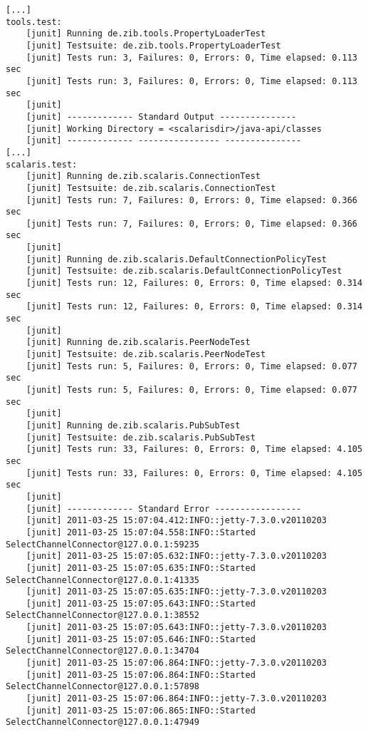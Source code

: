 \begin{lstlisting}[language={}]
%> make java-test
[...]
tools.test:
    [junit] Running de.zib.tools.PropertyLoaderTest
    [junit] Testsuite: de.zib.tools.PropertyLoaderTest
    [junit] Tests run: 3, Failures: 0, Errors: 0, Time elapsed: 0.113 sec
    [junit] Tests run: 3, Failures: 0, Errors: 0, Time elapsed: 0.113 sec
    [junit] 
    [junit] ------------- Standard Output ---------------
    [junit] Working Directory = <scalarisdir>/java-api/classes
    [junit] ------------- ---------------- ---------------
[...]
scalaris.test:
    [junit] Running de.zib.scalaris.ConnectionTest
    [junit] Testsuite: de.zib.scalaris.ConnectionTest
    [junit] Tests run: 7, Failures: 0, Errors: 0, Time elapsed: 0.366 sec
    [junit] Tests run: 7, Failures: 0, Errors: 0, Time elapsed: 0.366 sec
    [junit] 
    [junit] Running de.zib.scalaris.DefaultConnectionPolicyTest
    [junit] Testsuite: de.zib.scalaris.DefaultConnectionPolicyTest
    [junit] Tests run: 12, Failures: 0, Errors: 0, Time elapsed: 0.314 sec
    [junit] Tests run: 12, Failures: 0, Errors: 0, Time elapsed: 0.314 sec
    [junit] 
    [junit] Running de.zib.scalaris.PeerNodeTest
    [junit] Testsuite: de.zib.scalaris.PeerNodeTest
    [junit] Tests run: 5, Failures: 0, Errors: 0, Time elapsed: 0.077 sec
    [junit] Tests run: 5, Failures: 0, Errors: 0, Time elapsed: 0.077 sec
    [junit] 
    [junit] Running de.zib.scalaris.PubSubTest
    [junit] Testsuite: de.zib.scalaris.PubSubTest
    [junit] Tests run: 33, Failures: 0, Errors: 0, Time elapsed: 4.105 sec
    [junit] Tests run: 33, Failures: 0, Errors: 0, Time elapsed: 4.105 sec
    [junit] 
    [junit] ------------- Standard Error -----------------
    [junit] 2011-03-25 15:07:04.412:INFO::jetty-7.3.0.v20110203
    [junit] 2011-03-25 15:07:04.558:INFO::Started SelectChannelConnector@127.0.0.1:59235
    [junit] 2011-03-25 15:07:05.632:INFO::jetty-7.3.0.v20110203
    [junit] 2011-03-25 15:07:05.635:INFO::Started SelectChannelConnector@127.0.0.1:41335
    [junit] 2011-03-25 15:07:05.635:INFO::jetty-7.3.0.v20110203
    [junit] 2011-03-25 15:07:05.643:INFO::Started SelectChannelConnector@127.0.0.1:38552
    [junit] 2011-03-25 15:07:05.643:INFO::jetty-7.3.0.v20110203
    [junit] 2011-03-25 15:07:05.646:INFO::Started SelectChannelConnector@127.0.0.1:34704
    [junit] 2011-03-25 15:07:06.864:INFO::jetty-7.3.0.v20110203
    [junit] 2011-03-25 15:07:06.864:INFO::Started SelectChannelConnector@127.0.0.1:57898
    [junit] 2011-03-25 15:07:06.864:INFO::jetty-7.3.0.v20110203
    [junit] 2011-03-25 15:07:06.865:INFO::Started SelectChannelConnector@127.0.0.1:47949

\end{lstlisting}
